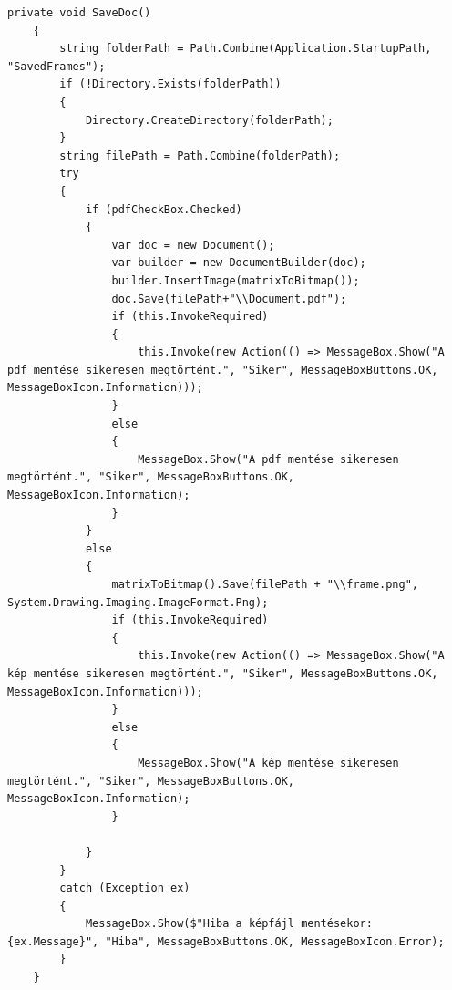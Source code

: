 \documentclass[]{thesis-ekf}
\theoremstyle{definition}
\theoremstyle{remark}
\begin{document}
\begin{lstlisting}[language=CSharp]
	private void SaveDoc()
	{
		string folderPath = Path.Combine(Application.StartupPath, "SavedFrames");
		if (!Directory.Exists(folderPath))
		{
			Directory.CreateDirectory(folderPath);
		}
		string filePath = Path.Combine(folderPath);
		try 
		{
			if (pdfCheckBox.Checked)
			{
				var doc = new Document();
				var builder = new DocumentBuilder(doc);
				builder.InsertImage(matrixToBitmap());
				doc.Save(filePath+"\\Document.pdf");
				if (this.InvokeRequired)
				{
					this.Invoke(new Action(() => MessageBox.Show("A pdf mentése sikeresen megtörtént.", "Siker", MessageBoxButtons.OK, MessageBoxIcon.Information)));
				}
				else
				{
					MessageBox.Show("A pdf mentése sikeresen megtörtént.", "Siker", MessageBoxButtons.OK, MessageBoxIcon.Information);
				}
			}
			else
			{
				matrixToBitmap().Save(filePath + "\\frame.png", System.Drawing.Imaging.ImageFormat.Png);
				if (this.InvokeRequired)
				{
					this.Invoke(new Action(() => MessageBox.Show("A kép mentése sikeresen megtörtént.", "Siker", MessageBoxButtons.OK, MessageBoxIcon.Information)));
				}
				else
				{
					MessageBox.Show("A kép mentése sikeresen megtörtént.", "Siker", MessageBoxButtons.OK, MessageBoxIcon.Information);
				}
				
			}
		}
		catch (Exception ex)
		{
			MessageBox.Show($"Hiba a képfájl mentésekor: {ex.Message}", "Hiba", MessageBoxButtons.OK, MessageBoxIcon.Error);
		}
	}
\end{lstlisting}
\end{document}
